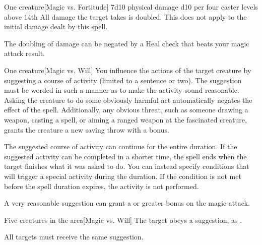 \spellrng{\rngclose}
\spelldur{\durshort}
\begin{spelltarget}{One creature}[Magic vs. Fortitude]
    \spelleffect 7d10 physical damage \add d10 per four caster levels above 14th
    \spellsuccess All damage the target takes is doubled. This does not apply to the initial damage dealt by this spell.
\end{spelltarget}
\spellnotes The doubling of damage can be negated by a Heal check that beats your magic attack result.

\spellrng{\rngclose}
\begin{spelltarget}{One creature}[Magic vs. Will]
    \spelleffect You influence the actions of the target creature by suggesting a course of activity (limited to a sentence or two). The suggestion must be worded in such a manner as to make the activity sound reasonable. Asking the creature to do some obviously harmful act automatically negates the effect of the spell. Additionally, any obvious threat, such as someone drawing a weapon, casting a spell, or aiming a ranged weapon at the fascinated creature, grants the creature a new saving throw with a  bonus.
    \par The suggested course of activity can continue for the entire duration. If the suggested activity can be completed in a shorter time, the spell ends when the target finishes what it was asked to do. You can instead specify conditions that will trigger a special activity during the duration. If the condition is not met before the spell duration expires, the activity is not performed.
\end{spelltarget}
\spellnotes A very reasonable suggestion can grant a  or greater bonus on the magic attack.

\norepeatspellnotes

\spelldur{\durmed}
\begin{spelltargets}{Five creatures in the area}[Magic vs. Will]
    \spelleffect The target obeys a suggestion, as .
\end{spelltargets}
\spellnotes All targets must receive the same suggestion.

